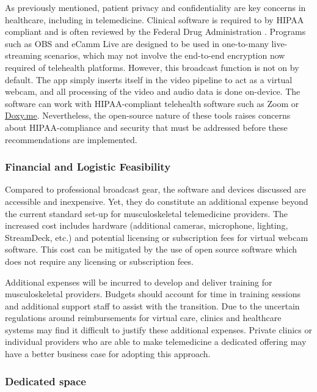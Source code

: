 \documentclass[utf8]{FrontiersinHarvard} %
\begin{document}
As previously mentioned, patient privacy and confidentiality are key concerns in healthcare, including in telemedicine. Clinical software is required to by HIPAA compliant and is often reviewed by the Federal Drug Administration \citep{jinTelemedicineCurrentImpact2020}. Programs such as OBS and eCamm Live are designed to be used in one-to-many live-streaming scenarios, which may not involve the end-to-end encryption now required of telehealth platforms. However, this broadcast function is not on by default. The app simply inserts itself in the video pipeline to act as a virtual webcam, and all processing of the video and audio data is done on-device. The software can work with HIPAA-compliant telehealth software such as Zoom or \href{http://Doxy.me}{Doxy.me}. Nevertheless, the open-source nature of these tools raises concerns about HIPAA-compliance and security that must be addressed before these recommendations are implemented.

\subsubsection{Financial and Logistic Feasibility}

Compared to professional broadcast gear, the software and devices discussed are accessible and inexpensive. Yet, they do constitute an additional expense beyond the current standard set-up for musculoskeletal telemedicine providers. The increased cost includes hardware (additional cameras, microphone, lighting, StreamDeck, etc.) and potential licensing or subscription fees for virtual webcam software. This cost can be mitigated by the use of open source software which does not require any licensing or subscription fees.

Additional expenses will be incurred to develop and deliver training for musculoskeletal providers. Budgets should account for time in training sessions and additional support staff to assist with the transition. Due to the uncertain regulations around reimbursements for virtual care, clinics and healthcare systems may find it difficult to justify these additional expenses. Private clinics or individual providers who are able to make telemedicine a dedicated offering may have a better business case for adopting this approach.

\subsubsection{Dedicated space}
\end{document}

